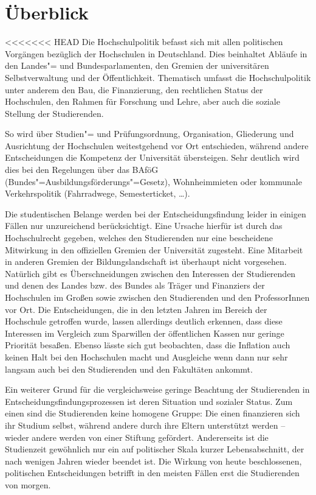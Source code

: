 \section{Überblick}
\label{hopo}

<<<<<<< HEAD
Die Hochschulpolitik befasst sich mit allen politischen Vorgängen bezüglich der
Hochschulen in Deutschland. Dies beinhaltet Abläufe in den Landes"= und
Bundesparlamenten, den Gremien der universitären Selbstverwaltung und der
Öffentlichkeit. Thematisch umfasst die Hochschulpolitik unter anderem den Bau,
die Finanzierung, den rechtlichen Status der Hochschulen, den Rahmen für
Forschung und Lehre, aber auch die soziale Stellung der Studierenden.

So wird über Studien"= und Prüfungsordnung, Organisation, Gliederung und
Ausrichtung der Hochschulen weitestgehend vor Ort entschieden, während andere
Entscheidungen die Kompetenz der Universität übersteigen. Sehr deutlich wird
dies bei den Regelungen über das BAföG (Bundes"=Ausbildungsförderungs"=Gesetz),
Wohnheimmieten oder kommunale Verkehrspolitik (Fahrradwege, Semesterticket,
\dots).

Die studentischen Belange werden bei der Entscheidungsfindung leider in einigen
Fällen nur unzureichend berücksichtigt. Eine Ursache hierfür ist durch das
Hochschulrecht gegeben, welches den Studierenden nur eine bescheidene
Mitwirkung in den offiziellen Gremien der Universität zugesteht. Eine Mitarbeit
in anderen Gremien der Bildungslandschaft ist überhaupt nicht vorgesehen.
Natürlich gibt es Überschneidungen zwischen den Interessen der Studierenden und
denen des Landes bzw. des Bundes als Träger und Finanziers der Hochschulen im
Großen sowie zwischen den Studierenden und den ProfessorInnen vor Ort. Die
Entscheidungen, die in den letzten Jahren im Bereich der Hochschule getroffen
wurde, lassen allerdings deutlich erkennen, dass diese Interessen im Vergleich
zum Sparwillen der öffentlichen Kassen nur geringe Priorität besaßen. Ebenso
lässte sich gut beobachten, dass die Inflation auch keinen Halt bei den
Hochschulen macht und Ausgleiche wenn dann nur sehr langsam auch bei den
Studierenden und den Fakultäten ankommt.

Ein weiterer Grund für die vergleichsweise geringe Beachtung der Studierenden
in Entscheidungsfindungsprozessen ist deren Situation und sozialer Status. Zum
einen sind die Studierenden keine homogene Gruppe: Die einen finanzieren sich
ihr Studium selbst, während andere durch ihre Eltern unterstützt werden --
wieder andere werden von einer Stiftung gefördert. Andererseits ist die
Studienzeit gewöhnlich nur ein auf politischer Skala kurzer Lebensabschnitt,
der nach wenigen Jahren wieder beendet ist. Die Wirkung von heute
beschlossenen, politischen Entscheidungen betrifft in den meisten Fällen erst
die Studierenden von morgen.

